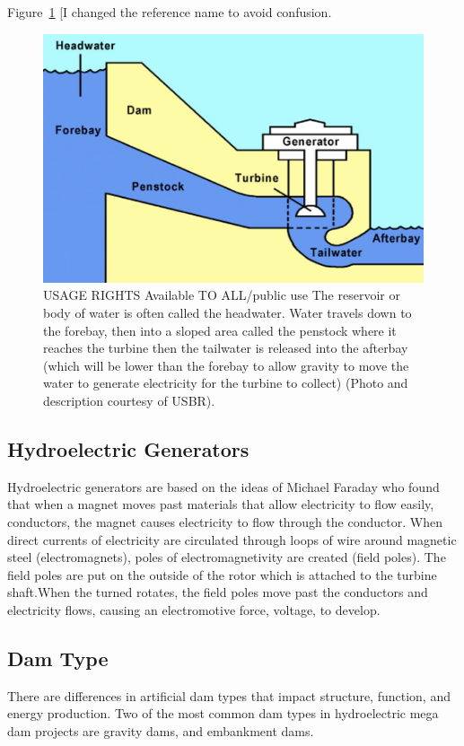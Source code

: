 \documentclass{book}\usepackage{knitr}
\begin{document}
{Figure~\ref{fig:USBR} [I changed the reference name to avoid confusion.

\begin{figure}
\includegraphics[width=\textwidth]{images/diagram.png}
\caption{USAGE RIGHTS Available TO ALL/public use The reservoir or body of water is often called the headwater. Water travels down to the forebay, then into a sloped area called the penstock where it reaches the turbine then the tailwater is released into the afterbay (which will be lower than the forebay to allow gravity to move the water to generate electricity for the turbine to collect) (Photo and description courtesy of USBR).}
\label{fig:USBR}
\end{figure}


\subsection{Hydroelectric Generators}
  Hydroelectric generators are based on the ideas of Michael Faraday who found that when a magnet moves past materials that allow electricity to flow easily, conductors, the magnet causes electricity to flow through the conductor. When direct currents of electricity are circulated through loops of wire around magnetic steel (electromagnets), poles of electromagnetivity are created (field poles). The field poles are put on the outside of the rotor which is attached to the turbine shaft.When the turned rotates, the field poles move past the conductors and electricity flows, causing an electromotive force, voltage, to develop. 
\subsection{Dam Type}
There are differences in artificial dam types that impact structure, function, and energy production. Two of the most common dam types in hydroelectric mega dam projects are gravity dams, and embankment dams. 
}
\end{document}
